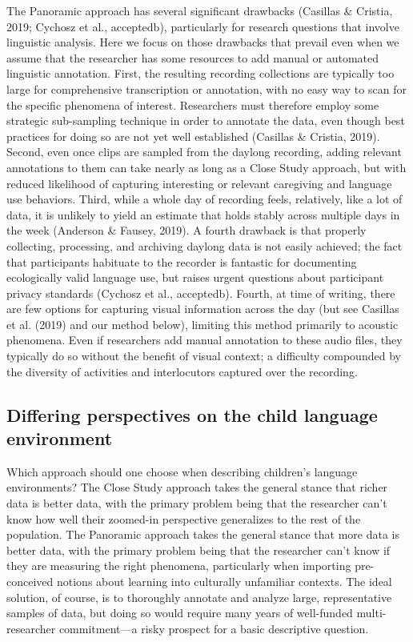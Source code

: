 \documentclass[,man,mask,floatsintext]{apa6}
\begin{document}
The Panoramic approach has several significant drawbacks (Casillas \&
Cristia, 2019; Cychosz et al., acceptedb), particularly for research
questions that involve linguistic analysis. Here we focus on those
drawbacks that prevail even when we assume that the researcher has some
resources to add manual or automated linguistic annotation. First, the
resulting recording collections are typically too large for
comprehensive transcription or annotation, with no easy way to scan for
the specific phenomena of interest. Researchers must therefore employ
some strategic sub-sampling technique in order to annotate the data,
even though best practices for doing so are not yet well established
(Casillas \& Cristia, 2019). Second, even once clips are sampled from
the daylong recording, adding relevant annotations to them can take
nearly as long as a Close Study approach, but with reduced likelihood of
capturing interesting or relevant caregiving and language use behaviors.
Third, while a whole day of recording feels, relatively, like a lot of
data, it is unlikely to yield an estimate that holds stably across
multiple days in the week (Anderson \& Fausey, 2019). A fourth drawback
is that properly collecting, processing, and archiving daylong data is
not easily achieved; the fact that participants habituate to the
recorder is fantastic for documenting ecologically valid language use,
but raises urgent questions about participant privacy standards (Cychosz
et al., acceptedb). Fourth, at time of writing, there are few options
for capturing visual information across the day (but see Casillas et al.
(2019) and our method below), limiting this method primarily to acoustic
phenomena. Even if researchers add manual annotation to these audio
files, they typically do so without the benefit of visual context; a
difficulty compounded by the diversity of activities and interlocutors
captured over the recording.

\subsection{Differing perspectives on the child language
environment}\label{differing-perspectives-on-the-child-language-environment}

Which approach should one choose when describing children's language
environments? The Close Study approach takes the general stance that
richer data is better data, with the primary problem being that the
researcher can't know how well their zoomed-in perspective generalizes
to the rest of the population. The Panoramic approach takes the general
stance that more data is better data, with the primary problem being
that the researcher can't know if they are measuring the right
phenomena, particularly when importing pre-conceived notions about
learning into culturally unfamiliar contexts. The ideal solution, of
course, is to thoroughly annotate and analyze large, representative
samples of data, but doing so would require many years of well-funded
multi-researcher commitment---a risky prospect for a basic descriptive
question.
\end{document}
